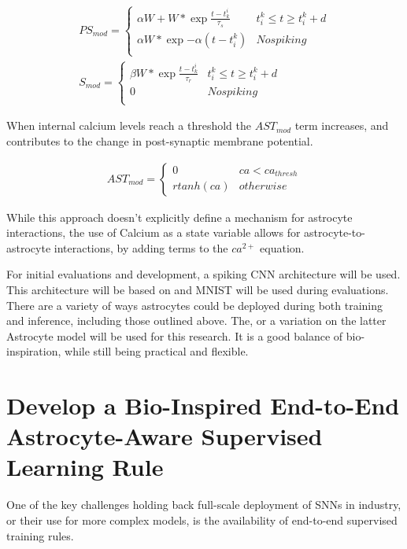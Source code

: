     \begin{align}
        PS_{mod} = 
        \begin{cases} 
            \alpha W + W * \exp{\frac{t-t^i_k}{\tau_s}} & t_i^k \leq t \geq t_i^k + d \\
            \alpha W * \exp{-\alpha(t - t_i^k)} & No spiking\\
        \end{cases} \label{eq:realtime_sgnn_eq9} \\
        S_{mod} = 
        \begin{cases} 
            \beta W * \exp{\frac{t-t^i_k}{\tau_r}} & t_i^k \leq t \geq t_i^k + d \\
            0 & No spiking\\
        \end{cases} \label{eq:realtime_sgnn_eq10}
    \end{align}
    
    
    When internal calcium levels reach a threshold the $AST_{mod}$ term increases, and contributes to the change in post-synaptic membrane potential.
    
    \begin{align}
        AST_{mod} =
        \begin{cases} 
            0 & ca < ca_{thresh} \\
            r tanh(ca) & otherwise
        \end{cases}
    \end{align}
    
    While this approach doesn't explicitly define a mechanism for astrocyte interactions, the use of Calcium as a state variable allows for astrocyte-to-astrocyte interactions, by adding terms to the $ca^{2+}$ equation.
    
    For initial evaluations and development, a spiking CNN architecture will be used. This architecture will be based on \cite{rstdp_mnist} and MNIST will be used during evaluations. There are a variety of ways astrocytes could be deployed during both training and inference, including those outlined above. The, or a variation on the latter Astrocyte model will be used for this research. It is a good balance of bio-inspiration, while still being practical and flexible.
    
    
    \section{Develop a Bio-Inspired End-to-End Astrocyte-Aware Supervised Learning Rule}
    One of the key challenges holding back full-scale deployment of SNNs in industry, or their use for more complex models, is the availability of end-to-end supervised training rules.
    
